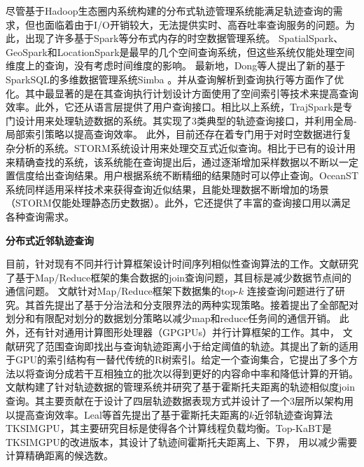 尽管基于Hadoop生态圈内系统构建的分布式轨迹管理系统能满足轨迹查询的需求，但也面临着由于I/O开销较大，无法提供实时、高吞吐率查询服务的问题。为此，出现了许多基于Spark等分布式内存的时空数据管理系统。
SpatialSpark\cite{SpatialSpark}、GeoSpark\cite{GeoSpark}和LocationSpark\cite{Locationspark}是最早的几个空间查询系统，但这些系统仅能处理空间维度上的查询，没有考虑时间维度的影响。
最新地，Dong等人提出了新的基于SparkSQL的多维数据管理系统Simba \cite{Simba}。并从查询解析到查询执行等方面作了优化。其中最显著的是在其查询执行计划设计方面使用了空间索引等技术来提高查询效率。此外，它还从语言层提供了用户查询接口。相比以上系统，TrajSpark\cite{TrajSpark}是专门设计用来处理轨迹数据的系统。其实现了3类典型的轨迹查询接口，并利用全局-局部索引策略以提高查询效率。
此外，目前还存在着专门用于对时空数据进行复杂分析的系统\cite{OceanST,STORM}。STORM\cite{STORM}系统设计用来处理交互式近似查询。相比于已有的设计用来精确查找的系统，该系统能在查询提出后，通过逐渐增加采样数据以不断以一定置信度给出查询结果。用户根据系统不断精细的结果随时可以停止查询。OceanST\cite{OceanST}系统同样适用采样技术来获得查询近似结果，且能处理数据不断增加的场景（STORM仅能处理静态历史数据）。此外，它还提供了丰富的查询接口用以满足各种查询需求。



\textbf{分布式近邻轨迹查询}

目前，针对现有不同并行计算框架设计时间序列相似性查询算法的工作。文献\cite{kimICDE2012}研究了基于Map/Reduce框架的集合数据的join查询问题，其目标是减少数据节点间的通信问题。
文献\cite{kimICDE2012}针对Map/Reduce框架下数据集的top-$k$ 连接查询问题进行了研究。其首先提出了基于分治法和分支限界法的两种实现策略。接着提出了全部配对划分和有限配对划分的数据划分策略以减少map和reduce任务间的通信开销。
此外，还有针对通用计算图形处理器（GPGPUs）并行计算框架的工作\cite{GowanlockC14,Zhang2012U2STRA,LealGZY15}。其中，
文献\cite{GowanlockC14}研究了范围查询即找出与查询轨迹距离小于给定阈值的轨迹。其提出了新的适用于GPU的索引结构有一替代传统的R树索引。给定一个查询集合，它提出了多个方法以将查询分成若干互相独立的批次以得到更好的内容命中率和降低计算的开销。
文献\cite{Zhang2012U2STRA}构建了针对轨迹数据的管理系统并研究了基于霍斯托夫距离的轨迹相似度join查询。其主要贡献在于设计了四层轨迹数据表现方式并设计了一个3层所以架构用以提高查询效率。Leal等\cite{LealGZY15}首先提出了基于霍斯托夫距离的$k$近邻轨迹查询算法TKSIMGPU，其主要研究目标是使得各个计算线程负载均衡。Top-KaBT\cite{LealGZY16}是TKSIMGPU的改进版本，其设计了轨迹间霍斯托夫距离上、下界， 用以减少需要计算精确距离的候选数。

